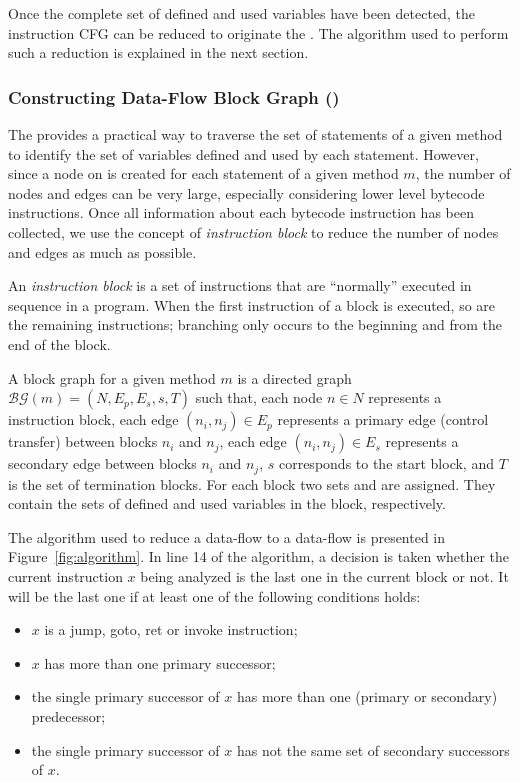 Once the complete set of defined and used variables have been
detected, the instruction CFG can be reduced to originate the \BG.
The algorithm used to perform such a reduction is explained in the
next section.

\subsubsection{Constructing Data-Flow Block Graph
(\BG)}\label{sec:bcfg}

The \IG provides a practical way to traverse the set of statements
of a given method to identify the set of variables defined and
used by each statement. However, since a node on \IG is created
for each statement of a given method $m$, the number of nodes and
edges can be very large, especially considering lower level
bytecode instructions. Once all information about each bytecode
instruction has been collected, we use the concept of
\emph{instruction block} to reduce the number of nodes and edges
as much as possible.

An \emph{instruction block} is a set of instructions that are
``normally'' executed in sequence in a program. When the first
instruction of a block is executed, so are the remaining
instructions; branching only occurs to the beginning and from the
end of the block.

A block graph for a given method $m$ is a directed graph
$\mathcal{BG}(m) = (N, E_p, E_s, s, T)$ such that, each node $n
\in N$ represents a instruction block, each edge $(n_i, n_j) \in
E_p$ represents a primary edge (control transfer) between blocks
$n_i$ and $n_j$, each edge $(n_i, n_j) \in E_s$ represents a
secondary edge between blocks $n_i$ and $n_j$, $s$ corresponds to
the start block, and $T$ is the set of termination blocks. For
each block two sets  and  are assigned. They
contain the sets of defined and used variables in the block,
respectively.

The algorithm used to reduce a data-flow \IG to a data-flow  \BG
is presented in Figure~\ref{fig:algorithm}. In line 14 of the
algorithm, a decision is taken whether the current instruction $x$
being analyzed is the last one in the current block or not. It
will be the last one if at least one of the following conditions
holds:

\begin{itemize}
   \item $x$ is a jump, goto, ret or invoke instruction;
   \item $x$ has more than one primary successor;
   \item the single primary successor of $x$ has more than
         one (primary or secondary) predecessor;
   \item the single primary successor of $x$ has not the
         same set of secondary successors of $x$.
\end{itemize}

